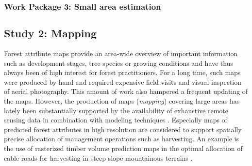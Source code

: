 \subsubsection{Work Package 3: Small area estimation} %

%
%
%
%
%

\newpage
\subsection{Study 2: Mapping} %


Forest attribute maps provide an area-wide overview of important information such as development stages, tree species or growing conditions and have thus always been of high interest for forest practitioners. For a long time, such maps were produced by hand and required expensive field visits and visual inspection of aerial photography. This amount of work also hampered a frequent updating of the maps. However, the production of maps (\textit{mapping}) covering large areas has lately been substantially supported by the availability of exhaustive remote sensing data in combination with modeling techniques \citep{brosofske2014}. Especially maps of predicted forest attributes in high resolution are considered to support spatially precise allocation of management operations such as harvesting. An example is the use of rasterized timber volume prediction maps in the optimal allocation of cable roads for harvesting in steep slope mountainous terrains \citep{bont2012, bont2015}.\par

